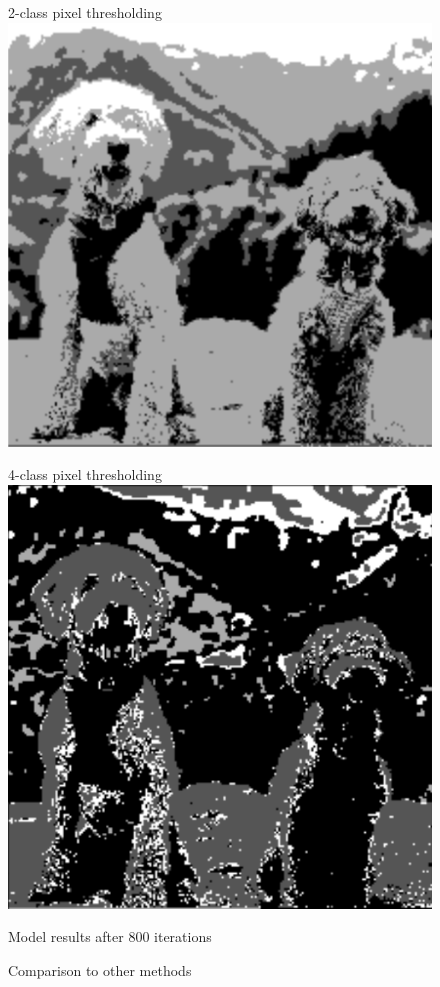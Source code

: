\documentclass[11pt]{article}
\begin{document}
\begin{figure}[!htb]
\begin{center}
\begin{multicols}{4}
    2-class pixel thresholding
	\includegraphics[width = \linewidth]{threshold}\par
    4-class pixel thresholding
	\includegraphics[width = \linewidth]{clustered}\par
    Model results after 800 iterations
\end{multicols}
\caption{Comparison to other methods}
\end{center}
\end{figure}
\end{document}
